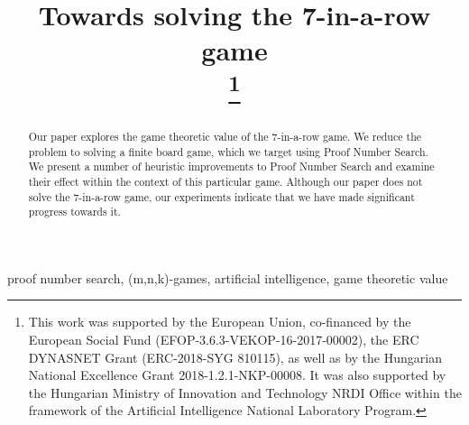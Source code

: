 \documentclass[conference]{IEEEtran}
\theoremstyle{definition}
\begin{document}
\title{Towards solving the 7-in-a-row game\\
\thanks{This work was supported by the European Union, co-financed by
  the European Social Fund (EFOP-3.6.3-VEKOP-16-2017-00002), the ERC DYNASNET Grant (ERC-2018-SYG 810115), as well as by the Hungarian National Excellence Grant
  2018-1.2.1-NKP-00008. It was also supported by the Hungarian Ministry of
  Innovation and Technology NRDI Office within the framework of the
  Artificial Intelligence National Laboratory Program.}
}


\author{
\and
{}
\and
{}
\and
{}
}

\maketitle

\begin{abstract}
Our paper explores the game theoretic value of the 7-in-a-row game. We reduce the problem to solving a finite board game, which we target using Proof Number Search. We present a number of heuristic improvements to Proof Number Search and examine their effect within the context of this particular game. Although our paper does not solve the 7-in-a-row game, our experiments indicate that we have made significant progress towards it.
\end{abstract}

\begin{IEEEkeywords}
proof number search, (m,n,k)-games, artificial intelligence, game theoretic value
\end{IEEEkeywords}
\end{document}
